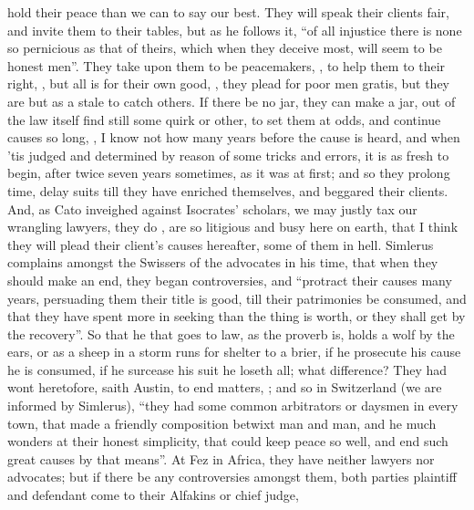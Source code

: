 hold their peace than we can to say our best. They will speak their clients
fair, and invite them to their tables, but as he follows it,
\enquote{of all injustice there is none so pernicious as that of
theirs, which when they deceive most, will seem to be honest men}. They take
upon them to be peacemakers, , to help them to
their right, , but all is for
their own good, , they plead for poor men
gratis, but they are but as a stale to catch others. If there be no jar,
they can make a jar, out of the law itself find still some
quirk or other, to set them at odds, and continue causes so long, , I know not how many years before the cause is heard, and when 'tis
judged and determined by reason of some tricks and errors, it is as fresh to
begin, after twice seven years sometimes, as it was at first; and so they
prolong time, delay suits till they have enriched themselves, and beggared
their clients. And, as Cato inveighed against Isocrates'
scholars, we may justly tax our wrangling lawyers, they do , are so litigious and busy here on earth, that I think they will plead
their client's causes hereafter, some of them in hell.
Simlerus complains amongst the Swissers of the advocates in
his time, that when they should make an end, they began controversies, and
\enquote{protract their causes many years, persuading them their title is good, till
their patrimonies be consumed, and that they have spent more in seeking than
the thing is worth, or they shall get by the recovery}. So that he that goes to
law, as the proverb is, holds a wolf by the ears, or as a
sheep in a storm runs for shelter to a brier, if he prosecute his cause he is
consumed, if he surcease his suit he loseth all; what
difference? They had wont heretofore, saith Austin, to end matters, ; and so in Switzerland (we are informed by
Simlerus), \enquote{they had some common arbitrators or daysmen in
every town, that made a friendly composition betwixt man and man, and he much
wonders at their honest simplicity, that could keep peace so well, and end such
great causes by that means}. At Fez in Africa, they have
neither lawyers nor advocates; but if there be any controversies amongst them,
both parties plaintiff and defendant come to their Alfakins or chief judge,
